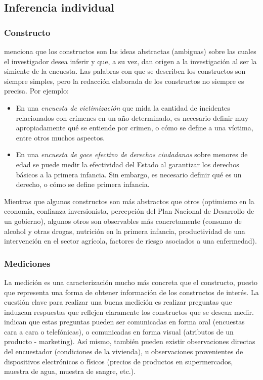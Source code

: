 \documentclass[
  12pt,
]{book}
\providecommand{\tightlist}{%
  \setlength{\itemsep}{0pt}\setlength{\parskip}{0pt}}
\begin{document}
\hypertarget{inferencia-individual}{%
\subsection{Inferencia individual}\label{inferencia-individual}}

\hypertarget{constructo}{%
\subsubsection{Constructo}\label{constructo}}

\citet{Gutierrez_2016} menciona que los constructos son las ideas abstractas (ambiguas) sobre las cuales el investigador desea inferir y que, a su vez, dan origen a la investigación al ser la simiente de la encuesta. Las palabras con que se describen los constructos son siempre simples, pero la redacción elaborada de los constructos no siempre es precisa. Por ejemplo:

\begin{itemize}
\tightlist
\item
  En una \emph{encuesta de victimización} que mida la cantidad de incidentes relacionados con crímenes en un año determinado, es necesario definir muy apropiadamente qué se entiende por crimen, o cómo se define a una víctima, entre otros muchos aspectos.
\item
  En una \emph{encuesta de goce efectivo de derechos ciudadanos} sobre menores de edad se puede medir la efectividad del Estado al garantizar los derechos básicos a la primera infancia. Sin embargo, es necesario definir qué es un derecho, o cómo se define primera infancia.
\end{itemize}

Mientras que algunos constructos son más abstractos que otros (optimismo en la economía, confianza inversionista, percepción del Plan Nacional de Desarrollo de un gobierno), algunos otros son observables más concretamente (consumo de alcohol y otras drogas, nutrición en la primera infancia, productividad de una intervención en el sector agrícola, factores de riesgo asociados a una enfermedad).

\hypertarget{mediciones}{%
\subsubsection{Mediciones}\label{mediciones}}

La medición es una caracterización mucho más concreta que el constructo, puesto que representa una forma de obtener información de los constructos de interés. La cuestión clave para realizar una buena medición es realizar preguntas que induzcan respuestas que reflejen claramente los constructos que se desean medir. \citet{Groves_Fowler_Couper_Lepkowski_Singer_Tourangeau_2009} indican que estas preguntas pueden ser comunicadas en forma oral (encuestas cara a cara o telefónicas), o comunicadas en forma visual (atributos de un producto - marketing). Así mismo, también pueden existir observaciones directas del encuestador (condiciones de la vivienda), u observaciones provenientes de dispositivos electrónicos o físicos (precios de productos en supermercados, muestra de agua, muestra de sangre, etc.).
\end{document}
